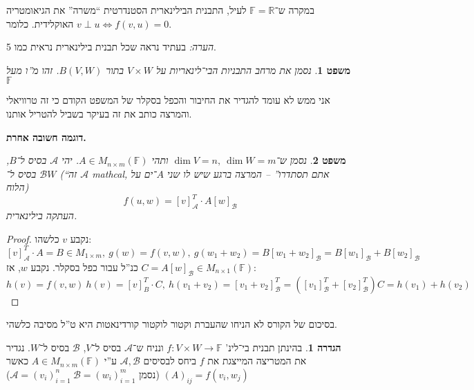 \documentclass[]{article}
\newcommand\R     {\mathbb{R}}
\newcommand\ac    {\mathcal{A}}
\newcommand\bc    {\mathcal{B}}
\newcommand\F         {\mathbb{F}}
\newcommand\co        {\colon}
\newtheorem{Theorem}{משפט}
\theoremstyle{definition}
\newtheorem{definition}{הגדרה}
\newcommand\theo  [1] {\begin{Theorem}#1\end{Theorem}}
\newcommand\defi  [1] {\begin{definition}#1\end{definition}}
\begin{document}
    במקרה ש־$\F = \R$ לעיל, התבנית הבילינארית הסטנדרטית ``משרה'' את הגיאומטריה האוקלידית. כלומר $v \perp u \iff f(v, u) = 0$. 
    
    \textit{הערה: }בעתיד נראה שכל תבנית בילינארית נראית כמו 5. 
    
    \theo{נסמן את מרחב התבניות הבי־לינאריות על $V \times W$ בתור $B(V, W)$. זהו מ''ו מעל $\F$}
    אני ממש לא עומד להגדיר את החיבור והכפל בסקלר של המשפט הקודם כי זה טרוויאלי והמרצה כותב את זה בעיקר בשביל להטריל אותנו. 
    
    \textbf{דוגמה חשובה אחרת. }\theo{נסמן ש־$\dim V = n, \ \dim W = m$ ותהי $A \in M_{n \times m}(\F)$. יהי $\ac$ בסיס ל־$B$, $\bc$ בסיס ל־$W$ (``זה $\ac$ mathcal, אתם תסתדרו'' – המרצה ברגע שיש לו שני $A$־ים על הלוח)\[ f(u, w) = [v]_\ac^T \cdot A[w]_{\bc} \] העתקה בילינארית. }
    \begin{proof}
        נקבע $v$ כלשהו: 
        \[ [v]_\ac^T \cdot A = B \in M_{1 \times m}, \ g(w) = f(v, w), \ g(w_1 + w_2) = B[w_1 + w_2]_\bc = B[w_1]_\bc + B[w_2]_\bc \]
        כנ''ל עבור כפל בסקלר. 
        נקבע $w$, אז $C = A[w]_\bc \in M_{n \times 1}(\F)$: 
        \[ h(v) = f(v, w) \ h(v) = [v]_B^T \cdot C, \ h(v_1 + v_2) = [v_1 + v_2]_\bc^T = ([v_1]_\bc^T + [v_2]_\bc^T)C = h(v_1) + h(v_2) \]
    \end{proof}
    בסיכום של הקורס לא הניחו שהעברת וקטור לוקטור קורדינאטות היא ט''ל מסיבה כלשהי. 
    \defi{בהינתן תבנית בי־לינ' $f \co V \times W \to \F$ ונניח ש־$\ac$ בסיס ל־$V$, $\bc$ בסיס ל־$W$. נגדיר את המטריצה המייצגת את $f$ ביחס לבסיסים $\ac, \bc$ ע''י $A \in M_{n \times m}(\F)$ כאשר $(A)_{ij} = f(v_i, w_j)$ (נסמן $\ac = (v_i)_{i =1}^n \ \bc = (w_i)_{i = 1}^{m}$)}
    
\end{document}
